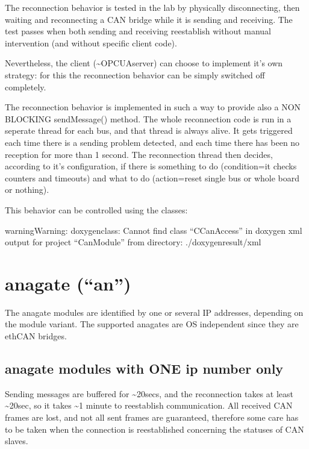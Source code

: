 \documentclass[a4paper,10pt,english]{sphinxmanual}
\begin{document}
\sphinxAtStartPar
The reconnection behavior is tested in the lab by physically disconnecting, then waiting
and reconnecting a CAN bridge while it is sending and receiving. The test passes when
both sending and receiving reestablish without manual intervention (and without specific client code).

\sphinxAtStartPar
Nevertheless, the client (\textasciitilde{}OPCUAserver) can choose to implement it’s own strategy: for this
the reconnection behavior can be simply switched off completely.

\sphinxAtStartPar
The reconnection behavior is implemented in such a way to provide also a NON BLOCKING sendMessage() method.
The whole reconnection code is run in a seperate thread for each bus, and that thread is always alive. It gets
triggered each time there is a sending problem detected, and each time there has been no reception for more than 1 second.
The reconnection thread then decides, according to it’s configuration, if there is something to do (condition=it checks
counters and timeouts) and what to do (action=reset single bus or whole board or nothing).

\sphinxAtStartPar
This behavior can be controlled using the classes:

\begin{sphinxadmonition}{warning}{Warning:}
\sphinxAtStartPar
doxygenclass: Cannot find class “CCanAccess” in doxygen xml output for project “CanModule” from directory: ./doxygen\sphinxhyphen{}result/xml
\end{sphinxadmonition}


\section{anagate (“an”)}
\label{\detokenize{reconnection:anagate-an}}
\sphinxAtStartPar
The anagate modules are identified by one or several IP addresses, depending on the module variant.
The supported anagates are OS independent since they are eth\sphinxhyphen{}CAN bridges.


\subsection{anagate modules with ONE ip number only}
\label{\detokenize{reconnection:anagate-modules-with-one-ip-number-only}}
\sphinxAtStartPar
Sending messages are buffered for \textasciitilde{}20secs, and the reconnection
takes at least \textasciitilde{}20sec, so it takes \textasciitilde{}1 minute to reestablish communication. All received CAN frames
are lost, and not all sent frames are guaranteed, therefore some care has to be taken when the
connection is reestablished concerning the statuses of CAN slaves.
\end{document}
